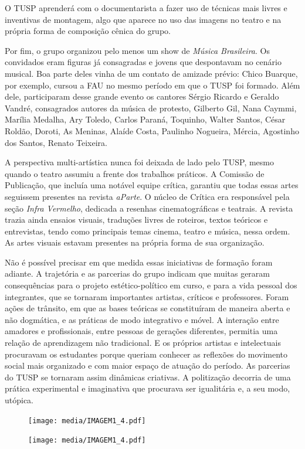 O TUSP aprenderá com o documentarista a fazer uso de técnicas mais
livres e inventivas de montagem, algo que aparece no uso das imagens no
teatro e na própria forma de composição cênica do grupo.

Por fim, o grupo organizou pelo menos um show de \textit{Música
Brasileira}. Os convidados eram figuras já consagradas e jovens que
despontavam no cenário musical. Boa parte deles vinha de um contato de
amizade prévio: Chico Buarque, por exemplo, cursou a FAU no mesmo
período em que o TUSP foi formado. Além dele, participaram desse grande
evento os cantores Sérgio Ricardo e Geraldo Vandré, consagrados autores
da música de protesto, Gilberto Gil, Nana Caymmi, Marília Medalha, Ary
Toledo, Carlos Paraná, Toquinho, Walter Santos, César Roldão, Doroti, As
Meninas, Alaíde Costa, Paulinho Nogueira, Mércia, Agostinho dos Santos,
Renato Teixeira.

A perspectiva multi-artística nunca foi deixada de lado pelo TUSP, mesmo
quando o teatro assumiu a frente dos trabalhos práticos. A Comissão de
Publicação, que incluía uma notável equipe crítica, garantiu que todas
essas artes seguissem presentes na revista \textit{aParte}. O núcleo de
Crítica era responsável pela seção \textit{Infra Vermelho}, dedicada a
resenhas cinematográficas e teatrais. A revista trazia ainda ensaios
visuais, traduções livres de roteiros, textos teóricos e entrevistas,
tendo como principais temas cinema, teatro e música, nessa ordem. As
artes visuais estavam presentes na própria forma de sua organização.

Não é possível precisar em que medida essas iniciativas de formação
foram adiante. A trajetória e as parcerias do grupo indicam que muitas
geraram consequências para o projeto estético-político em curso, e para
a vida pessoal dos integrantes, que se tornaram importantes artistas,
críticos e professores. Foram ações de trânsito, em que as bases
teóricas se constituíram de maneira aberta e não dogmática, e as
práticas de modo integrativo e móvel. A interação entre amadores e
profissionais, entre pessoas de gerações diferentes, permitia uma
relação de aprendizagem não tradicional. E os próprios artistas e
intelectuais procuravam os estudantes porque queriam conhecer as
reflexões do movimento social mais organizado e com maior espaço de
atuação do período. As parcerias do TUSP se tornaram assim dinâmicas
criativas. A politização decorria de uma prática experimental e
imaginativa que procurava ser igualitária e, a seu modo, utópica.

\begin{figure}
\texttt{[image: media/IMAGEM1\_4.pdf]}

\texttt{[image: media/IMAGEM1\_4.pdf]}
\end{figure}

